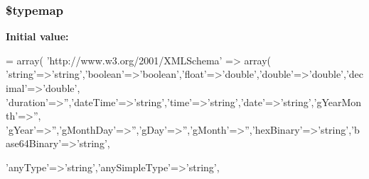 \subsubsection[{\$typemap}]{\setlength{\rightskip}{0pt plus 5cm}\$typemap}\label{classnusoap__base_abc776370d77b6fe463a62fa2faf26c2e}
{\bfseries Initial value\+:}
\begin{DoxyCode}
= array(
    \textcolor{stringliteral}{'http://www.w3.org/2001/XMLSchema'} => array(
        \textcolor{stringliteral}{'string'}=>\textcolor{stringliteral}{'string'},\textcolor{stringliteral}{'boolean'}=>\textcolor{stringliteral}{'boolean'},\textcolor{stringliteral}{'float'}=>\textcolor{stringliteral}{'double'},\textcolor{stringliteral}{'double'}=>\textcolor{stringliteral}{'double'},\textcolor{stringliteral}{'decimal'}=>\textcolor{stringliteral}{'double'},
        \textcolor{stringliteral}{'duration'}=>\textcolor{stringliteral}{''},\textcolor{stringliteral}{'dateTime'}=>\textcolor{stringliteral}{'string'},\textcolor{stringliteral}{'time'}=>\textcolor{stringliteral}{'string'},\textcolor{stringliteral}{'date'}=>\textcolor{stringliteral}{'string'},\textcolor{stringliteral}{'gYearMonth'}=>\textcolor{stringliteral}{''},
        \textcolor{stringliteral}{'gYear'}=>\textcolor{stringliteral}{''},\textcolor{stringliteral}{'gMonthDay'}=>\textcolor{stringliteral}{''},\textcolor{stringliteral}{'gDay'}=>\textcolor{stringliteral}{''},\textcolor{stringliteral}{'gMonth'}=>\textcolor{stringliteral}{''},\textcolor{stringliteral}{'hexBinary'}=>\textcolor{stringliteral}{'string'},\textcolor{stringliteral}{'base64Binary'}=>\textcolor{stringliteral}{'string'},
        
        \textcolor{stringliteral}{'anyType'}=>\textcolor{stringliteral}{'string'},\textcolor{stringliteral}{'anySimpleType'}=>\textcolor{stringliteral}{'string'},
        

\end{DoxyCode}
